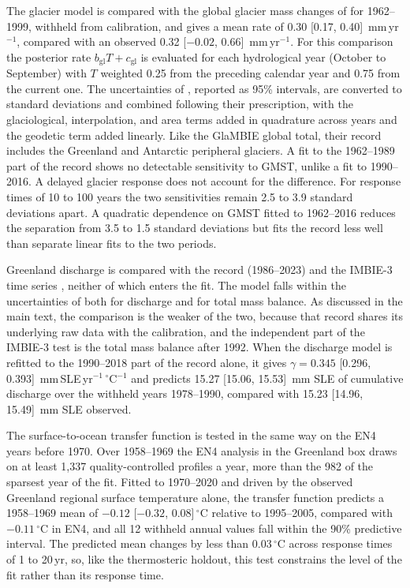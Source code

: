 \documentclass[12pt]{article}
\begin{document}
The glacier model is compared with the global glacier mass changes of \citet{Zemp2019} for 1962--1999, withheld from calibration, and gives a mean rate of 0.30 [0.17, 0.40]~mm\,yr$^{-1}$, compared with an observed 0.32 [$-0.02$, 0.66]~mm\,yr$^{-1}$. For this comparison the posterior rate $b_{\mathrm{gl}}T + c_{\mathrm{gl}}$ is evaluated for each hydrological year (October to September) with $T$ weighted 0.25 from the preceding calendar year and 0.75 from the current one. The uncertainties of \citet{Zemp2019}, reported as 95\% intervals, are converted to standard deviations and combined following their prescription, with the glaciological, interpolation, and area terms added in quadrature across years and the geodetic term added linearly. Like the GlaMBIE global total, their record includes the Greenland and Antarctic peripheral glaciers. A fit to the 1962--1989 part of the \citet{Zemp2019} record shows no detectable sensitivity to GMST, unlike a fit to 1990--2016. A delayed glacier response does not account for the difference. For response times of 10 to 100 years the two sensitivities remain 2.5 to 3.9 standard deviations apart. A quadratic dependence on GMST fitted to 1962--2016 reduces the separation from 3.5 to 1.5 standard deviations but fits the record less well than separate linear fits to the two periods.

Greenland discharge is compared with the \citet{Mankoff2021} record (1986--2023) and the IMBIE-3 time series \citep{Otosaka2026}, neither of which enters the fit. The model falls within the uncertainties of both for discharge and for total mass balance. As discussed in the main text, the \citet{Mankoff2021} comparison is the weaker of the two, because that record shares its underlying raw data with the \citet{Mouginot2019} calibration, and the independent part of the IMBIE-3 test is the total mass balance after 1992. When the discharge model is refitted to the 1990--2018 part of the \citet{Mouginot2019} record alone, it gives $\gamma = 0.345$ [0.296, 0.393]~mm\,SLE\,yr$^{-1}$\,$^\circ$C$^{-1}$ and predicts 15.27 [15.06, 15.53]~mm SLE of cumulative discharge over the withheld years 1978--1990, compared with 15.23 [14.96, 15.49]~mm SLE observed.

The surface-to-ocean transfer function is tested in the same way on the EN4 years before 1970. Over 1958--1969 the EN4 analysis in the Greenland box draws on at least 1,337 quality-controlled profiles a year, more than the 982 of the sparsest year of the fit. Fitted to 1970--2020 and driven by the observed Greenland regional surface temperature alone, the transfer function predicts a 1958--1969 mean of $-0.12$ [$-0.32$, 0.08]\,$^\circ$C relative to 1995--2005, compared with $-0.11$\,$^\circ$C in EN4, and all 12 withheld annual values fall within the 90\% predictive interval. The predicted mean changes by less than 0.03\,$^\circ$C across response times of 1 to 20\,yr, so, like the thermosteric holdout, this test constrains the level of the fit rather than its response time.
\end{document}
